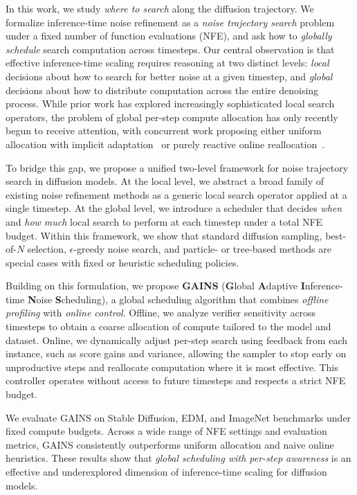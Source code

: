 In this work, we study \emph{where to search} along the diffusion trajectory.
We formalize inference-time noise refinement as a \emph{noise trajectory search}
problem under a fixed number of function evaluations (NFE), and ask how to
\emph{globally schedule} search computation across timesteps.
Our central observation is that effective inference-time scaling requires
reasoning at two distinct levels: \emph{local} decisions about how to search for
better noise at a given timestep, and \emph{global} decisions about how to
distribute computation across the entire denoising process.
While prior work has explored increasingly sophisticated local search operators,
the problem of global per-step compute allocation has only recently begun
to receive attention, with concurrent work proposing either uniform allocation
with implicit adaptation~\citep{ramesh2025nts} or purely reactive online
reallocation~\citep{kim2025rbf}.

To bridge this gap, we propose a unified two-level framework for noise trajectory
search in diffusion models.
At the local level, we abstract a broad family of existing noise refinement
methods as a generic local search operator applied at a single timestep.
At the global level, we introduce a scheduler that decides \emph{when} and
\emph{how much} local search to perform at each timestep under a total NFE
budget.
Within this framework, we show that standard diffusion sampling, best-of-$N$
selection, $\epsilon$-greedy noise search, and particle- or tree-based methods
are special cases with fixed or heuristic scheduling
policies.

Building on this formulation, we propose \textbf{GAINS} (\textbf{G}lobal \textbf{A}daptive \textbf{I}nference-time \textbf{N}oise \textbf{S}cheduling), a global scheduling algorithm that
combines \emph{offline profiling} with \emph{online control}.
Offline, we analyze verifier sensitivity across timesteps to obtain a coarse
allocation of compute tailored to the model and dataset.
Online, we dynamically adjust per-step search using feedback from each instance,
such as score gains and variance, allowing the sampler to stop early on
unproductive steps and reallocate computation where it is most effective.
This controller operates without access to future timesteps and
respects a strict NFE budget.

We evaluate GAINS on Stable Diffusion, EDM, and ImageNet benchmarks under
fixed compute budgets.
Across a wide range of NFE settings and evaluation metrics, GAINS consistently outperforms uniform allocation and naive
online heuristics.
These results show that \emph{global scheduling with per-step awareness}
is an effective and underexplored dimension of inference-time scaling
for diffusion models.

